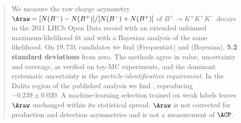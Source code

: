 \begin{abstract}
We measure the raw charge asymmetry $\Araw=[N(B^-)-N(B^+)]/[N(B^-)+N(B^+)]$ of $B^{\pm}\to K^{\pm}K^{+}K^{-}$ decays in the 2011 LHCb Open Data record with an extended unbinned maximum-likelihood fit and with a Bayesian analysis of the same likelihood. On $19{,}731$ candidates we find  (Frequentist) and  (Bayesian), \textbf{5.2 standard deviations} from zero. The methods agree in value, uncertainty and coverage, as verified on toy-MC experiments, and the dominant systematic uncertainty is the \emph{particle-identification requirement}. In the Dalitz region of the published analysis we find , reproducing $-0.239\pm0.020$. A machine-learning selection trained on weak labels leaves $\Araw$ unchanged within its statistical spread. $\Araw$ is not corrected for production and detection asymmetries and is not a measurement of $\ACP$.
\end{abstract}
